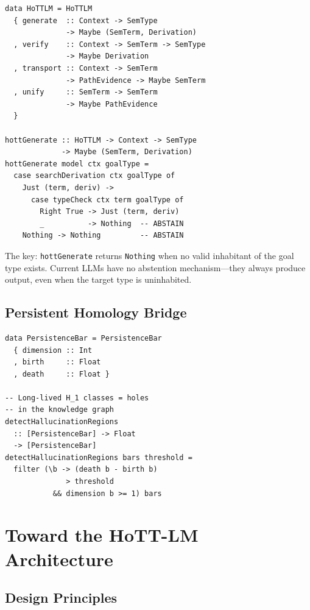 \documentclass[11pt,a4paper]{article}
\theoremstyle{plain}
\theoremstyle{definition}
\begin{document}
\begin{lstlisting}[caption={Generation as type inhabitation search}]
data HoTTLM = HoTTLM
  { generate  :: Context -> SemType
              -> Maybe (SemTerm, Derivation)
  , verify    :: Context -> SemTerm -> SemType
              -> Maybe Derivation
  , transport :: Context -> SemTerm
              -> PathEvidence -> Maybe SemTerm
  , unify     :: SemTerm -> SemTerm
              -> Maybe PathEvidence
  }

hottGenerate :: HoTTLM -> Context -> SemType
             -> Maybe (SemTerm, Derivation)
hottGenerate model ctx goalType =
  case searchDerivation ctx goalType of
    Just (term, deriv) ->
      case typeCheck ctx term goalType of
        Right True -> Just (term, deriv)
        _          -> Nothing  -- ABSTAIN
    Nothing -> Nothing         -- ABSTAIN
\end{lstlisting}

The key: \texttt{hottGenerate} returns \texttt{Nothing} when no valid inhabitant of the goal type exists. Current LLMs have no abstention mechanism---they always produce output, even when the target type is uninhabited.

\subsection{Persistent Homology Bridge}

\begin{lstlisting}[caption={Persistence-based hallucination detection}]
data PersistenceBar = PersistenceBar
  { dimension :: Int
  , birth     :: Float
  , death     :: Float }

-- Long-lived H_1 classes = holes
-- in the knowledge graph
detectHallucinationRegions
  :: [PersistenceBar] -> Float
  -> [PersistenceBar]
detectHallucinationRegions bars threshold =
  filter (\b -> (death b - birth b)
              > threshold
           && dimension b >= 1) bars
\end{lstlisting}

\section{Toward the HoTT-LM Architecture}\label{sec:architecture}

\subsection{Design Principles}
\end{document}
